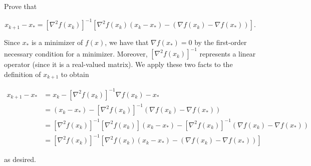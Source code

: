 Prove that 

$$
x_{k+1} - x_* = \left[\nabla^2 f(x_k)\right]^{-1} \left[ \nabla^2 f(x_k)(x_k - x_*) - \left( \nabla f(x_k) - \nabla f(x_*) \right) \right].
$$

\begin{solution}
    Since $x_*$ is a minimizer of $f(x)$, we have that $\nabla f(x_*) = 0$ by the first-order necessary condition for a
    minimizer. Moreover, $\left[\nabla^2 f(x_k) \right]^{-1}$ represents a linear operator (since it is a real-valued 
    matrix). We apply these two facts to the definition of $x_{k+1}$ to obtain

    \begin{align*}
    x_{k+1} - x_* &= x_k - \left[\nabla^2 f(x_k) \right]^{-1} \nabla f(x_k) - x_* \\
                  &= (x_k - x_*) - \left[\nabla^2 f(x_k) \right]^{-1} \left(\nabla f(x_k) - \nabla f(x_*) \right) \\
                  &= \left[\nabla^2 f(x_k) \right]^{-1} \left[\nabla^2 f(x_k) \right] (x_k - x_*) - \left[\nabla^2 f(x_k) \right]^{-1} \left(\nabla f(x_k) - \nabla f(x_*) \right) \\
                  &= \left[\nabla^2 f(x_k) \right]^{-1} \left[ \nabla^2 f(x_k)(x_k - x_*) - \left( \nabla f(x_k) - \nabla f(x_*) \right) \right]
    \end{align*}

    as desired.
    \ \\
\end{solution}
